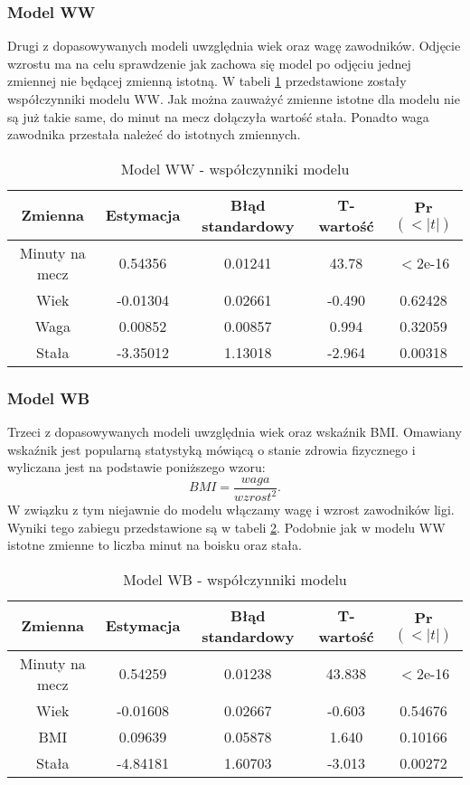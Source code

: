 \documentclass[11pt,a4paper]{article}
\begin{document}
\subsubsection{Model WW}
Drugi z dopasowywanych modeli uwzględnia wiek oraz wagę zawodników. Odjęcie wzrostu ma na celu sprawdzenie jak zachowa się model po odjęciu jednej zmiennej nie będącej zmienną istotną. W tabeli \ref{model_ww} przedstawione zostały współczynniki modelu WW. Jak można zauważyć zmienne istotne dla modelu nie są już takie same, do minut na mecz dołączyła wartość stała. Ponadto waga zawodnika przestała należeć do istotnych zmiennych.

\begin{table}[H]
	\begin{tabular}{| c | c | c | c | c |}
		\hline
		Zmienna & Estymacja & Błąd standardowy & T-wartość & Pr$(<|t|)$\\ \hline
		Minuty na mecz & 0.54356 & 0.01241 & 43.78 & $<$2e-16\\ \hline
		Wiek & -0.01304 & 0.02661 & -0.490 & 0.62428 \\ \hline 
		Waga & 0.00852 & 0.00857 & 0.994 & 0.32059\\ \hline
		Stała & -3.35012 & 1.13018 & -2.964 & 0.00318\\ \hline
	\end{tabular}
	\caption{Model WW - współczynniki modelu}
	\label{model_ww}
\end{table}

\subsubsection{Model WB}
Trzeci z dopasowywanych modeli uwzględnia wiek oraz wskaźnik BMI. Omawiany wskaźnik jest popularną statystyką mówiącą o stanie zdrowia fizycznego i wyliczana jest na podstawie poniższego wzoru:
\begin{equation}
BMI = \frac{waga}{wzrost^2}.
\end{equation}
W związku z tym niejawnie do modelu włączamy wagę i wzrost zawodników ligi. Wyniki tego zabiegu przedstawione są w tabeli \ref{model_wb}. Podobnie jak w modelu WW istotne zmienne to liczba minut na boisku oraz stała. 
\begin{table}[H]
	\begin{tabular}{| c | c | c | c | c |}
		\hline
		Zmienna & Estymacja & Błąd standardowy & T-wartość & Pr$(<|t|)$\\ \hline
		Minuty na mecz & 0.54259 & 0.01238 & 43.838 & $<$2e-16\\ \hline
		Wiek & -0.01608 & 0.02667 & -0.603 & 0.54676\\ \hline 
		BMI & 0.09639 & 0.05878 & 1.640 & 0.10166\\ \hline  
		Stała & -4.84181 & 1.60703 & -3.013 & 0.00272\\ \hline	
	\end{tabular}
	\caption{Model WB - współczynniki modelu}
	\label{model_wb}
\end{table}
\end{document}
